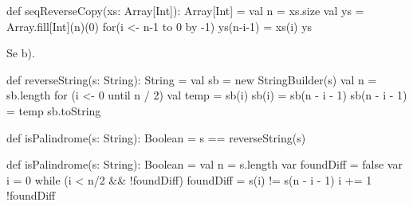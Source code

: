 \Subtask \begin{Code}
def seqReverseCopy(xs: Array[Int]): Array[Int] = {
  val n = xs.size
  val ys = Array.fill[Int](n)(0)
  for(i <- n-1 to 0 by -1) ys(n-i-1) = xs(i)
  ys
}
\end{Code}

\Subtask Se b).


\Task %

\Subtask \begin{Code}
def reverseString(s: String): String = {
  val sb = new StringBuilder(s)
  val n = sb.length
  for (i <- 0 until n / 2) { 
    val temp = sb(i)
    sb(i) = sb(n - i - 1)
    sb(n - i - 1) = temp
  }
  sb.toString     
}
\end{Code}

\Subtask \begin{Code}
def isPalindrome(s: String): Boolean = {s == reverseString(s)}
\end{Code}

\Subtask \begin{Code}
def isPalindrome(s: String): Boolean = {
  val n = s.length
  var foundDiff = false
  var i = 0
  while (i < n/2 && !foundDiff)  { 
    foundDiff = s(i) != s(n - i - 1)
    i += 1
  }
  !foundDiff
}
\end{Code}


\Task %

\Subtask {}

